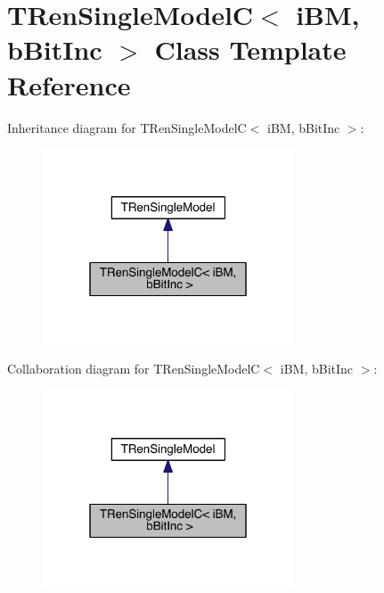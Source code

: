 \hypertarget{class_t_ren_single_model_c}{}\section{T\+Ren\+Single\+ModelC$<$ i\+BM, b\+Bit\+Inc $>$ Class Template Reference}
\label{class_t_ren_single_model_c}


Inheritance diagram for T\+Ren\+Single\+ModelC$<$ i\+BM, b\+Bit\+Inc $>$\+:
\nopagebreak
\begin{figure}[H]
\begin{center}
\leavevmode
\includegraphics[width=211pt]{dd/daa/class_t_ren_single_model_c__inherit__graph}
\end{center}
\end{figure}


Collaboration diagram for T\+Ren\+Single\+ModelC$<$ i\+BM, b\+Bit\+Inc $>$\+:
\nopagebreak
\begin{figure}[H]
\begin{center}
\leavevmode
\includegraphics[width=211pt]{d1/d12/class_t_ren_single_model_c__coll__graph}
\end{center}
\end{figure}
